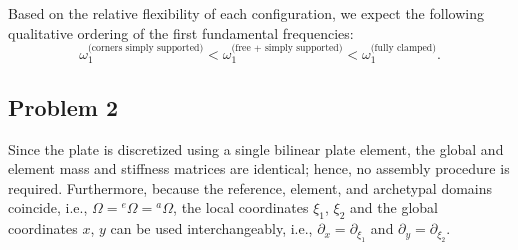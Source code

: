 \documentclass[12pt]{article}
\begin{document}
Based on the relative flexibility of each configuration, we expect the following qualitative ordering of the first fundamental frequencies:
\[
    \omega_1^{\text{(corners simply supported)}} < \omega_1^{\text{(free + simply supported)}} < \omega_1^{\text{(fully clamped)}}.
\]

\subsection*{Problem 2}
Since the plate is discretized using a single bilinear plate element, the global and element mass and stiffness matrices are identical; hence, no assembly procedure is required. Furthermore, because the reference, element, and archetypal domains coincide, i.e., $\Omega = {}^e\Omega = {}^a\Omega$, the local coordinates $\xi_1$, $\xi_2$ and the global coordinates $x$, $y$ can be used interchangeably, i.e., $\partial_x=\partial_{\xi_1}$ and $\partial_y=\partial_{\xi_2}$.
\end{document}
